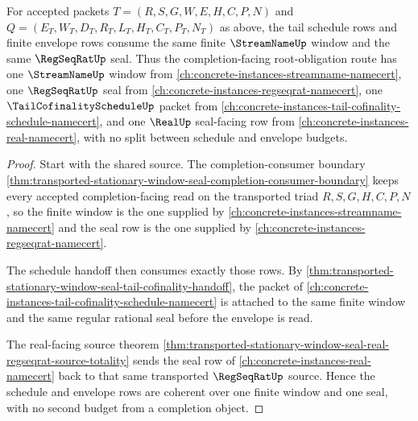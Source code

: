 \begin{theorem}
\label{thm:transported-stationary-window-seal-finite-window-schedule-coherence}
For accepted packets $T=(R,S,G,W,E,H,C,P,N)$ and $Q=(E_T,W_T,D_T,R_T,L_T,H_T,C_T,P_T,N_T)$ as above, the tail schedule rows and finite envelope rows consume the same finite $\StreamNameUp$ window and the same $\RegSeqRatUp$ seal. Thus the completion-facing root-obligation route has one $\StreamNameUp$ window from \autoref{ch:concrete-instances-streamname-namecert}, one $\RegSeqRatUp$ seal from \autoref{ch:concrete-instances-regseqrat-namecert}, one $\TailCofinalityScheduleUp$ packet from \autoref{ch:concrete-instances-tail-cofinality-schedule-namecert}, and one $\RealUp$ seal-facing row from \autoref{ch:concrete-instances-real-namecert}, with no split between schedule and envelope budgets.
\end{theorem}
\begin{proof}
Start with the shared source. The completion-consumer boundary \autoref{thm:transported-stationary-window-seal-completion-consumer-boundary} keeps every accepted completion-facing read on the transported triad $R,S,G,H,C,P,N$, so the finite window is the one supplied by \autoref{ch:concrete-instances-streamname-namecert} and the seal row is the one supplied by \autoref{ch:concrete-instances-regseqrat-namecert}.

The schedule handoff then consumes exactly those rows. By \autoref{thm:transported-stationary-window-seal-tail-cofinality-handoff}, the packet of \autoref{ch:concrete-instances-tail-cofinality-schedule-namecert} is attached to the same finite window and the same regular rational seal before the envelope is read.

The real-facing source theorem \autoref{thm:transported-stationary-window-seal-real-regseqrat-source-totality} sends the seal row of \autoref{ch:concrete-instances-real-namecert} back to that same transported $\RegSeqRatUp$ source. Hence the schedule and envelope rows are coherent over one finite window and one seal, with no second budget from a completion object.
\end{proof}


